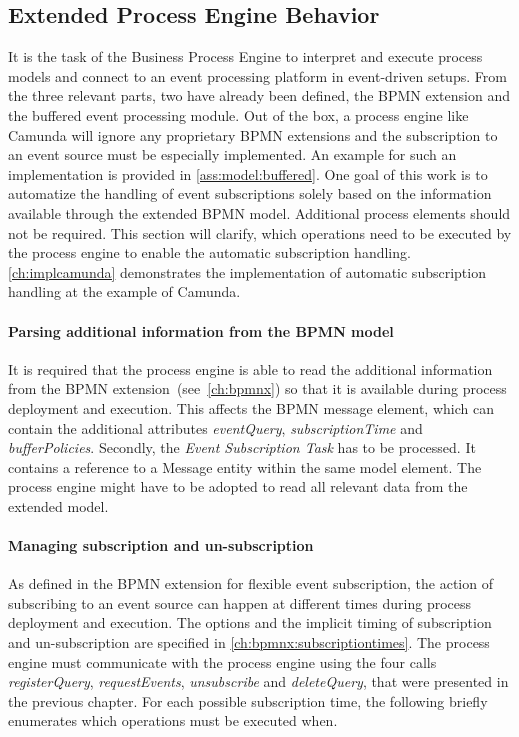 \subsection{Extended Process Engine Behavior}\label{ch:extendedprocessengine}
It is the task of the Business Process Engine to interpret and execute process models and connect to an event processing platform in event-driven setups.
From the three relevant parts, two have already been defined, the BPMN extension and the buffered event processing module.
Out of the box, a process engine like Camunda will ignore any proprietary BPMN extensions and the subscription to an event source must be especially implemented. An example for such an implementation is provided in \autoref{ass:model:buffered}.
One goal of this work is to automatize the handling of event subscriptions solely based on the information available through the extended BPMN model. Additional process elements should not be required.
This section will clarify, which operations need to be executed by the process engine to enable the automatic subscription handling.
\autoref{ch:implcamunda} demonstrates the implementation of automatic subscription handling at the example of Camunda.

\paragraph{Parsing additional information from the BPMN model}
It is required that the process engine is able to read the additional information from the BPMN extension~(see~\autoref{ch:bpmnx}) so that it is available during process deployment and execution.
This affects the BPMN message element, which can contain the additional attributes \textit{eventQuery}, \textit{subscriptionTime} and \textit{bufferPolicies}.
Secondly, the \textit{Event Subscription Task} has to be processed. It contains a reference to a Message entity within the same model element.
The process engine might have to be adopted to read all relevant data from the extended model.


\paragraph{Managing subscription and un-subscription}
As defined in the BPMN extension for flexible event subscription, the action of subscribing to an event source can happen at different times during process deployment and execution. The options and the implicit timing of subscription and un-subscription are specified in \autoref{ch:bpmnx:subscriptiontimes}.
The process engine must communicate with the process engine using the four calls \textit{registerQuery}, \textit{requestEvents}, \textit{unsubscribe} and \textit{deleteQuery}, that were presented in the previous chapter.
For each possible subscription time, the following briefly enumerates which operations must be executed when. 

